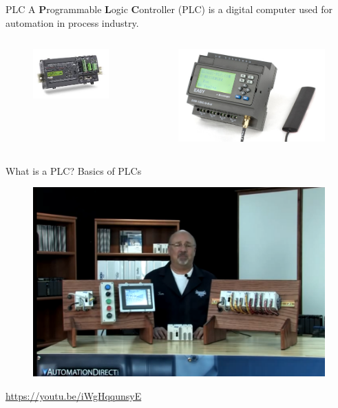 \begin{frame}{PLC}
	A \textbf {P}rogrammable \textbf{L}ogic \textbf{C}ontroller (PLC) is a digital computer used for automation in process industry. 
	\begin{columns}
		\begin{column}{0.5\textwidth}
			\begin{figure}
				\centering
				\includegraphics[width=0.7\linewidth]{img/PLC_1}
			\end{figure}

		\end{column}
		\begin{column}{0.5\textwidth}
			\begin{figure}
				\centering
				\includegraphics[width=0.7\linewidth]{img/PLC_2}
			\end{figure}
		\end{column}
	\end{columns}
\end{frame}

\begin{frame}{What is a PLC? Basics of PLCs}
	\begin{figure}
		\centering
		\includegraphics[width=0.7\linewidth]{img/what_is_a_plc}
	\end{figure}
	\url{https://youtu.be/iWgHqqunsyE}
\end{frame}


